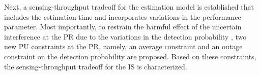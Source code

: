 Next, a sensing-throughput tradeoff for the estimation model is established that includes the estimation time and incorporates variations in the performance parameter. Most importantly, to restrain the harmful effect of the uncertain interference at the PR due to the variations in the detection probability%
, two new PU constraints at the PR, namely, an average constraint and an outage constraint on the detection probability are proposed. Based on these constraints, the sensing-throughput tradeoff for the IS is characterized. 


